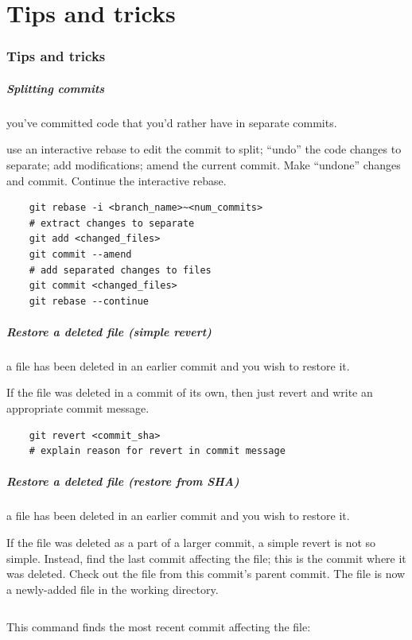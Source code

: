\part{Tips and tricks}

\section{Tips and tricks}

\begin{frame}[fragile]
    \frametitle{Splitting commits}
     you've committed code that you'd rather have in
        separate commits.

     use an interactive rebase to edit the commit
        to split; ``undo'' the code changes to separate; add
        modifications; amend the current commit.
        Make ``undone'' changes and commit.  Continue
        the interactive rebase.
    \begin{verbatim}
    git rebase -i <branch_name>~<num_commits>
    # extract changes to separate
    git add <changed_files>
    git commit --amend
    # add separated changes to files
    git commit <changed_files>
    git rebase --continue
    \end{verbatim}

\end{frame}

\begin{frame}[fragile]
    \frametitle{Restore a deleted file (simple revert)}
     a file has been deleted in an earlier commit and you wish
    to restore it.

     If the file was deleted in a commit of its own, then
    just revert and write an appropriate commit message.
    \begin{verbatim}
    git revert <commit_sha>
    # explain reason for revert in commit message
    \end{verbatim}
\end{frame}

\begin{frame}[fragile]
    \frametitle{Restore a deleted file (restore from SHA)}
     a file has been deleted in an earlier commit and you wish
    to restore it.

     If the file was deleted as a part of a larger commit, a
    simple revert is not so simple.  Instead, find the last commit affecting
    the file; this is the commit where it was deleted.  Check out the file
    from this commit's parent commit.  The file is now a newly-added file in
    the working directory.

    \inputminted{bash}{restore-deleted-file-from-sha.txt}

This command finds the most recent commit affecting the file:
    \inputminted{bash}{most-recent-commit-affecting-file.txt}

\end{frame}

